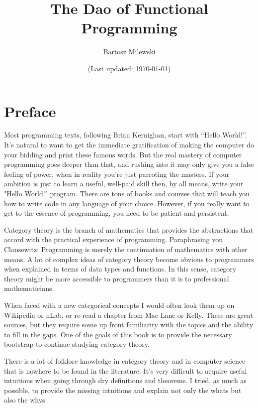 \documentclass[11pt, book]{memoir}
\begin{document}
\setcounter{tocdepth}{4}
\setcounter{secnumdepth}{4}
\frontmatter

\title{\huge The Dao of Functional Programming}
\author{\Large Bartosz Milewski }

\date{\vfill (Last updated: \today)}

\maketitle

\tableofcontents

\clearpage

\section{Preface}

Most programming texts, following Brian Kernighan, start with ``Hello World!''. It's natural to want to get the immediate gratification of making the computer do your bidding and print these famous words. But the real mastery of computer programming goes deeper than that, and rushing into it may only give you a false feeling of power, when in reality you're just parroting the masters. If your ambition is just to learn a useful, well-paid skill then, by all means, write your "Hello World!" program. There are tons of books and courses that will teach you how to write code in any language of your choice. However, if you really want to get to the essence of programming, you need to be patient and persistent.

Category theory is the branch of mathematics that provides the abstractions that accord with the practical experience of programming. Paraphrasing von Clausewitz: Programming is merely the continuation of mathematics with other means. A lot of complex ideas of category theory become obvious to programmers when explained in terms of data types and functions. In this sense, category theory might be more accessible to programmers than it is to professional mathematicians.

When faced with a new categorical concepts I would often look them up on Wikipedia or nLab, or re-read a chapter from Mac Lane or Kelly. These are great sources, but they require some up front familiarity with the topics and the ability to fill in the gaps. One of the goals of this book is to provide the necessary bootstrap to continue studying category theory.

There is a lot of folklore knowledge in category theory and in computer science that is nowhere to be found in the literature. It's very difficult to acquire useful intuitions when going through dry definitions and theorems. I tried, as much as possible, to provide the missing intuitions and explain not only the whats but also the whys.
\end{document}
